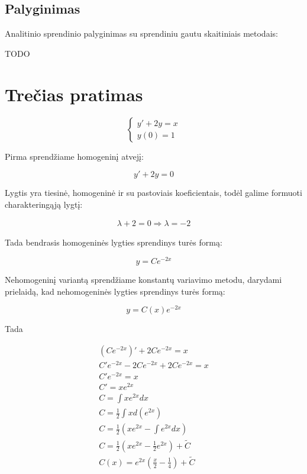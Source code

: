 \documentclass[11pt]{article}
\begin{document}
\subsection{Palyginimas}

Analitinio sprendinio palyginimas su sprendiniu gautu skaitiniais metodais:

TODO

\newpage
\section{Trečias pratimas}

\begin{equation}
\begin{cases}
     y'+2y=x  \\
     y(0)=1 
\end{cases}
\end{equation}

Pirma sprendžiame homogeninį atvejį:

\begin{equation}
y'+2y=0
\end{equation}

Lygtis yra tiesinė, homogeninė ir su pastoviais koeficientais, todėl galime formuoti charakteringąją lygtį:

\begin{equation}
\begin{split}
\lambda+2=0 \Rightarrow \lambda=-2
\end{split}
\end{equation}

Tada bendrasis homogeninės lygties sprendinys turės formą:

\begin{equation}
y=Ce^{-2x}
\end{equation}

Nehomogeninį variantą sprendžiame konstantų variavimo metodu, darydami prielaidą, kad nehomogeninės lygties sprendinys turės formą:

\begin{equation}
    y = C(x)e^{-2x}
\end{equation}

Tada

\begin{equation}
\begin{split}
(Ce^{-2x})'+2Ce^{-2x}=x\\
C'e^{-2x}-2Ce^{-2x}+2Ce^{-2x}=x\\
C'e^{-2x}=x\\
C'=xe^{2x}\\
C=\int xe^{2x}dx\\
C=\frac{1}{2}\int xd(e^{2x})\\
C=\frac{1}{2}\left(xe^{2x}-\int e^{2x}dx\right)\\
C=\frac{1}{2}\left(xe^{2x}-\frac{1}{2}e^{2x}\right)+\widetilde{C}\\
C(x)=e^{2x}\left(\frac{x}{2}-\frac{1}{4}\right)+\widetilde{C}
\end{split}
\end{equation}
\end{document}
